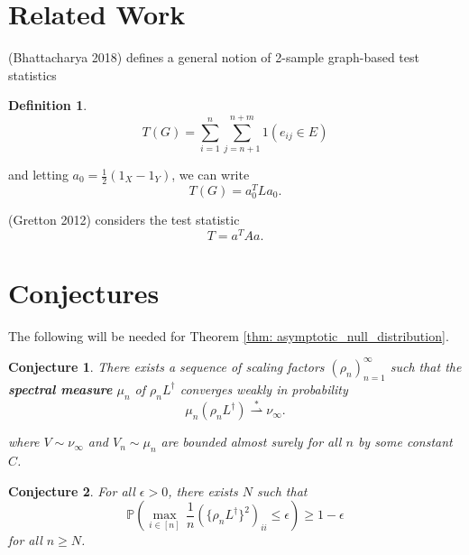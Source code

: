 \documentclass{article}
\newcommand{\Prob}[1]{\mathbb{P}\left( #1 \right)}
\newcommand{\Linv}{L^{\dagger}}
\theoremstyle{alden}
\newtheorem{conjecture}{Conjecture}
\theoremstyle{definition}
\newtheorem{definition}{Definition}[section]
\theoremstyle{remark}
\begin{document}
\section{Related Work}

(Bhattacharya 2018) defines a general notion of 2-sample graph-based test statistics
\begin{definition}
	\begin{equation*}
	T(G) = \sum_{i = 1}^{n} \sum_{j = n + 1}^{n + m} 1( e_{ij} \in E)
	\end{equation*}
\end{definition}
and letting $a_0 = \frac{1}{2} (1_X - 1_Y)$, we can write
\begin{equation*}
T(G) = a_0^T L a_0.
\end{equation*}

(Gretton 2012) considers the test statistic
\begin{equation*}
T = a^T A a.
\end{equation*}

\section{Conjectures}

The following will be needed for Theorem \ref{thm: asymptotic_null_distribution}.

\begin{conjecture}
	\label{conj: spectral_measure_conv}
	There exists a sequence of scaling factors $(\rho_n)_{n = 1}^{\infty}$ such that the \textbf{spectral measure} $\mu_n$ of $\rho_n \Linv$ converges weakly in probability
	\begin{equation*}
	\mu_n(\rho_n \Linv) \overset{\ast}{\rightharpoonup} \nu_{\infty}.
	\end{equation*}
	
	
	where $V \sim \nu_{\infty}$ and $V_n \sim \mu_n$ are bounded almost surely for all $n$ by some constant $C$. 
\end{conjecture}

\begin{conjecture}
	\label{conj: diagonal_entries}
	For all $\epsilon > 0$, there exists $N$ such that
	\begin{equation*}
	\Prob{\underset{i \in [n]}{\max} \, \frac{1}{n} \left(\{ \rho_n \Linv\}^2 \right)_{ii} \leq \epsilon} \geq 1 - \epsilon
	\end{equation*}
	for all $n \geq N$.
\end{conjecture}
\end{document}
